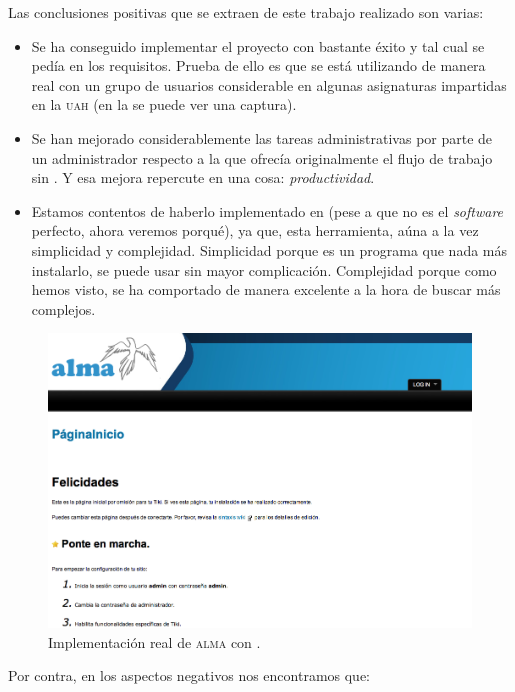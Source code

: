 Las conclusiones positivas que se extraen de este trabajo realizado son varias:

\begin{itemize}
\item Se ha conseguido implementar el proyecto \alma{} con bastante éxito y tal cual se pedía en los requisitos. Prueba de ello es que se está utilizando de manera real con un grupo de usuarios considerable en algunas asignaturas impartidas en la \textsc{uah} (en la  se puede ver una captura).
\item Se han mejorado considerablemente las tareas administrativas por parte de un administrador respecto a la que ofrecía originalmente el flujo de trabajo sin \profiles{}. Y esa mejora repercute en una cosa: \textit{productividad}.
\item Estamos contentos de haberlo implementado en \tiki{} (pese a que no es el \textit{software} perfecto, ahora veremos porqué), ya que, esta herramienta, aúna a la vez simplicidad y complejidad. Simplicidad porque es un programa que nada más instalarlo, se puede usar sin mayor complicación. Complejidad porque como hemos visto, se ha comportado de manera excelente a la hora de buscar  más complejos.
\end{itemize}

\begin{figure}
\centering
\includegraphics[width=\linewidth]{../graphics/fig_demostracion_alma.png}
\caption{Implementación real de \textsc{alma} con \tiki{}.}\label{fig:demostracion_alma}
\end{figure}

Por contra, en los aspectos negativos nos encontramos que:

